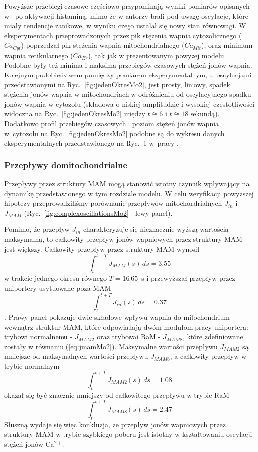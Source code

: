 Powyższe przebiegi czasowe częściowo przypominają wyniki pomiarów opisanych w~\cite{Ishii2006} po aktywacji histaminą, mimo że w \cite{Ishii2006} autorzy brali pod uwagę oscylacje, które miały tendencje zanikowe, w wyniku czego ustalał się nowy stan równowagi. W eksperymentach przeprowadzonych przez \cite{Ishii2006} pik stężenia wapnia cytozolicznego ($Ca_{Cyt}$) poprzedzał pik stężenia wapnia mitochondrialnego ($Ca_{Mit}$), oraz minimum wapnia retikularnego ($Ca_{Er}$), tak jak w prezentowanym powyżej modelu. Podobne były też minima i maksima przebiegów czasowych stężeń jonów wapnia. Kolejnym podobieństwem pomiędzy pomiarem eksperymentalnym, a~oscylacjami przedstawionymi na Ryc.~\ref{fig:jedenOkresMo2}, jest prosty, liniowy, spadek stężenia jonów wapnia w mitochondriach w odróżnieniu od  oscylacyjnego spadku jonów wapnia w cytozolu (składowa o niskiej amplitudzie i wysokiej częstotliwości widoczna na Ryc.~\ref{fig:jedenOkresMo2} między $t \cong 6$ i $t \cong 18$ sekundą). Dodatkowo profil przebiegów czasowych i poziom stężeń jonów wapnia w~cytozolu na Ryc.~\ref{fig:jedenOkresMo2} podobne są do wykresu danych eksperymentalnych przedstawionego na Ryc.~1 w~pracy \cite{Borghans1997}.

\subsubsection{Przepływy domitochondrialne}
Przepływy przez struktury MAM mogą stanowić istotny czynnik wpływający na dynamikę przedstawionego w tym rozdziale modelu. W celu weryfikacji powyższej hipotezy przeprowadziliśmy porównanie przepływów mitochondrialnych $J_{in}$ i $J_{MAM}$ (Ryc.~\ref{fig:complexoscillationsMo2} - lewy panel).

Pomimo, że przepływ $J_{in}$ charakteryzuje się nieznacznie wyższą wartością maksymalną, to całkowity przepływ jonów wapniowych przez struktury MAM jest większy. Całkowity przepływ przez struktury MAM wynosił \[\int_t^{t+T} J_{MAM}(s) \, ds = 3.55\]
w trakcie jednego okresu równego $T = 16.65$~s i przewyższał przepływ przez uniportery usytuowane poza MAM 
\[\int_t^{t+T} J_{in}(s) \, ds = 0.37\].
Prawy panel pokazuje dwie składowe wpływu wapnia do mitochondrium wewnątrz struktur MAM, które odpowiadają dwóm modułom pracy uniportera: trybowi normalnemu - $J_{MAM2}$ oraz trybowai RaM  - $J_{MAM8}$, które zdefiniowane zostały w równaniu (\ref{eq:jmamMo2}). Maksymalne wartości przepływu $J_{MAM2}$ są mniejsze od maksymalnych wartości przepływu $J_{MAM8}$, a całkowity przepływ  w trybie normalnym 
\[\int_t^{t+T} J_{MAM2}(s) \, ds = 1.08\]
okazał się być znacznie mniejszy od całkowitego przepływu w trybie RaM 
\[\int_t^{t+T} J_{MAM8}(s) \, ds = 2.47\]
Słuszną wydaje się więc konkluzja, że przepływ jonów wapniowych przez struktury MAM w trybie szybkiego poboru jest istotny w kształtowaniu oscylacji stężeń jonów Ca$^{2+}$.


